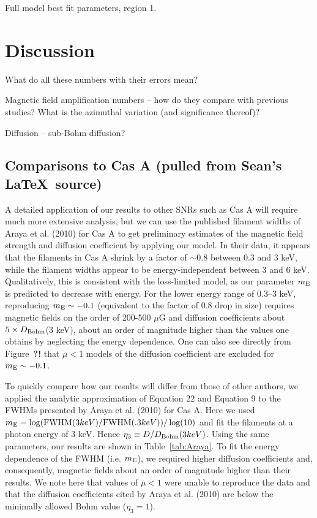\documentclass[manuscript]{aastex}  %
\begin{document}
\begin{table}
\centering
\caption{Full model best fit parameters, region 1.\label{tab:fit1}}

\end{table}


\section{Discussion}

What do all these numbers with their errors mean?

Magnetic field amplification numbers -- how do they compare with previous
studies?  What is the azimuthal variation (and significance thereof)?

Diffusion -- sub-Bohm diffusion?

\subsection{Comparisons to Cas A (pulled from Sean's \LaTeX\ source)}


A detailed application of our results to other SNRs such as Cas A will
require much more extensive analysis, but we can use the published
filament widths of Araya et al. (2010) for Cas A to get preliminary
estimates of the magnetic field strength and diffusion coefficient by
applying our model. In their data, it appears that the filaments in
Cas A shrink by a factor of $\sim 0.8$ between 0.3 and 3 keV, while the
filament widths appear to be energy-independent between 3 and 6 keV.
Qualitatively, this is consistent with the loss-limited model, as our
parameter $m_{\rm E}$ is predicted to decrease with energy.  For the
lower energy range of 0.3--3 keV, reproducing $m_{\rm E}\sim -0.1$
(equivalent to the factor of 0.8 drop in size) requires magnetic
fields on the order of 200-500 $\mu$G and diffusion coefficients about
$5 \times D_{\rm Bohm}$(3 keV), about an order of magnitude higher
than the values one obtains by neglecting the energy dependence. One
can also see directly from Figure~\textbf{?!} that $\mu < 1$ models
of the diffusion coefficient are excluded for $m_{\rm E}\sim -0.1$.


To quickly compare how our results will differ from those of other authors, we
applied the analytic approximation of Equation 22 and Equation 9 to the FWHMs
presented by Araya et al. (2010) for Cas A. Here we used $m_{\rm E} = \log(
{\rm FWHM}(3keV)/{\rm FWHM}(.3keV))/\log(10)$ and fit the filaments at a photon
energy of 3 keV.  Hence $\eta_3 \equiv D/D_{\rm Bohm}(3 keV)$. Using the same
parameters, our results are shown in Table~\ref{tab:Araya}. To fit the energy
dependence of the FWHM (i.e. $m_{\rm E}$), we required higher diffusion
coefficients and, consequently, magnetic fields about an order of magnitude
higher than their results. We note here that values of $\mu<1$ were unable to
reproduce the data and that the diffusion coefficients cited by Araya et al.
(2010) are below the minimally allowed Bohm value ($\eta_3 = 1$).
\end{document}
